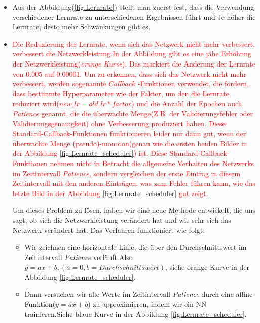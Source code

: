 \documentclass[12pt,a4paper]{scrartcl}
\numberwithin{equation}{section}
\begin{document}
\begin{itemize}
	\item Aus der Abbildung(\ref{fig:Lernrate}) stellt man zuerst fest, dass die Verwendung verschiedener Lernrate zu unterschiedenen Ergebnissen führt und Je höher die Lernrate, desto mehr Schwankungen gibt es.
	\item 
	\textcolor{red}{ Die Reduzierung der Lernrate, wenn sich das Netzwerk nicht mehr verbessert, verbessert die Netzwerkleistung.In der Abbildung gibt es eine jähe Erhöhung der Netzwerkleistung(\textit{orange Kurve}). Das markiert die Änderung der Lernrate von $ 0.005 $ auf $ 0.00001 $. Um zu erkennen, dass sich das Netzwerk nicht mehr verbessert, werden sogenannte \glqq $  Callback$ \grqq-Funktionen verwendet, die fordern, dass bestimmte Hyperparameter wie der Faktor, um den die Lernrate reduziert wird($ new\_lr = old\_lr*factor $) und die Anzahl der Epochen auch \textit{Patience} genannt, die die überwachte Menge(Z.B. der Validierungsfehler oder Validierungsgenauigkeit) ohne Verbesserung produziert haben. Diese Standard-Callback-Funktionen funktionieren leider nur dann gut, wenn der überwachte Menge (pseudo)-monoton(genau wie die ersten beiden Bilder in der Abbildung \ref{fig:Lernrate_scheduler}) ist. Diese Standard-Callback-Funktionen nehmen nicht in Betracht die allgemeine Verhalten des Netzwerks im Zeitintervall \textit{Patience}, sondern vergleichen der erste Eintrag in diesem Zeitintervall mit den anderen Einträgen, was zum Fehler führen kann, wie das letzte Bild in der Abbildung \ref{fig:Lernrate_scheduler} gut zeigt.}
	
	Um dieses Problem zu lösen, haben wir eine neue Methode entwickelt, die uns sagt, ob sich die Netzwerkleistung verändert hat und wie sehr sich das Netzwerk verändert hat. Das Verfahren funktioniert wie folgt:
	\begin{itemize}
		\item Wir zeichnen eine horizontale Linie, die über den Durchschnittswert im Zeitintervall \textit{Patience} verläuft.Also $ y = ax +b,( a=0, b= Durchschnittswert) $, siehe orange Kurve in der Abbildung \ref{fig:Lernrate_scheduler}.
		\item Dann versuchen wir alle Werte im Zeitintervall \textit{Patience} durch eine affine Funktion($ y=ax+b $) zu approximieren, indem wir ein \ac{NN} trainieren.Siehe blaue Kurve in der Abbildung \ref{fig:Lernrate_scheduler}.
	\end{itemize}

\end{itemize}
\end{document}
